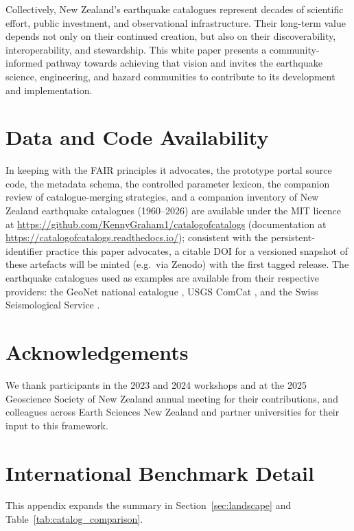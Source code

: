 \documentclass[11pt]{article}
\begin{document}
Collectively, New Zealand's earthquake catalogues represent decades of scientific effort, public investment, and observational infrastructure. Their long-term value depends not only on their continued creation, but also on their discoverability, interoperability, and stewardship. This white paper presents a community-informed pathway towards achieving that vision and invites the earthquake science, engineering, and hazard communities to contribute to its development and implementation.




\section*{Data and Code Availability}
In keeping with the FAIR principles it advocates, the prototype portal source code, the metadata schema, the controlled parameter lexicon, the companion review of catalogue-merging strategies, and a companion inventory of New Zealand earthquake catalogues (1960--2026) are available under the MIT licence at \url{https://github.com/KennyGraham1/catalogofcatalogs} (documentation at \url{https://catalogofcatalogs.readthedocs.io/}); consistent with the persistent-identifier practice this paper advocates, a citable DOI for a versioned snapshot of these artefacts will be minted (e.g.\ via Zenodo) with the first tagged release. The earthquake catalogues used as examples are available from their respective providers: the GeoNet national catalogue \citep{GeoNetEqCatalogue}, USGS ComCat \citep{usgs_comcat}, and the Swiss Seismological Service \citep{sed_report}.

\section*{Acknowledgements}
We thank participants in the 2023 and 2024 workshops and at the 2025 Geoscience Society of New Zealand annual meeting for their contributions, and colleagues across Earth Sciences New Zealand and partner universities for their input to this framework.


\appendix
\section{International Benchmark Detail}
\label{app:international}
This appendix expands the summary in Section~\ref{sec:landscape} and Table~\ref{tab:catalog_comparison}.
\end{document}
